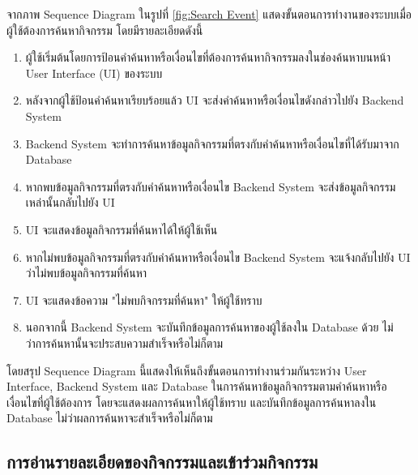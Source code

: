 \documentclass[14pt,oneside,openright,a4paper]{cpe-thai-project}
\begin{document}
  จากภาพ Sequence Diagram ในรูปที่ \ref{fig:Search Event} แสดงขั้นตอนการทำงานของระบบเมื่อผู้ใช้ต้องการค้นหากิจกรรม โดยมีรายละเอียดดังนี้
  \begin{enumerate}
    \item ผู้ใช้เริ่มต้นโดยการป้อนคำค้นหาหรือเงื่อนไขที่ต้องการค้นหากิจกรรมลงในช่องค้นหาบนหน้า User Interface (UI) ของระบบ
    \item หลังจากผู้ใช้ป้อนคำค้นหาเรียบร้อยแล้ว UI จะส่งคำค้นหาหรือเงื่อนไขดังกล่าวไปยัง Backend System
    \item Backend System จะทำการค้นหาข้อมูลกิจกรรมที่ตรงกับคำค้นหาหรือเงื่อนไขที่ได้รับมาจาก Database
    \item หากพบข้อมูลกิจกรรมที่ตรงกับคำค้นหาหรือเงื่อนไข Backend System จะส่งข้อมูลกิจกรรมเหล่านั้นกลับไปยัง UI
    \item UI จะแสดงข้อมูลกิจกรรมที่ค้นหาได้ให้ผู้ใช้เห็น
    \item หากไม่พบข้อมูลกิจกรรมที่ตรงกับคำค้นหาหรือเงื่อนไข Backend System จะแจ้งกลับไปยัง UI ว่าไม่พบข้อมูลกิจกรรมที่ค้นหา
    \item UI จะแสดงข้อความ "ไม่พบกิจกรรมที่ค้นหา" ให้ผู้ใช้ทราบ
    \item นอกจากนี้ Backend System จะบันทึกข้อมูลการค้นหาของผู้ใช้ลงใน Database ด้วย ไม่ว่าการค้นหานั้นจะประสบความสำเร็จหรือไม่ก็ตาม
  \end{enumerate}
  โดยสรุป Sequence Diagram นี้แสดงให้เห็นถึงขั้นตอนการทำงานร่วมกันระหว่าง User Interface, Backend System และ Database ในการค้นหาข้อมูลกิจกรรมตามคำค้นหาหรือเงื่อนไขที่ผู้ใช้ต้องการ โดยจะแสดงผลการค้นหาให้ผู้ใช้ทราบ และบันทึกข้อมูลการค้นหาลงใน Database ไม่ว่าผลการค้นหาจะสำเร็จหรือไม่ก็ตาม

  \newpage

\subsection{การอ่านรายละเอียดของกิจกรรมและเข้าร่วมกิจกรรม}
\end{document}
